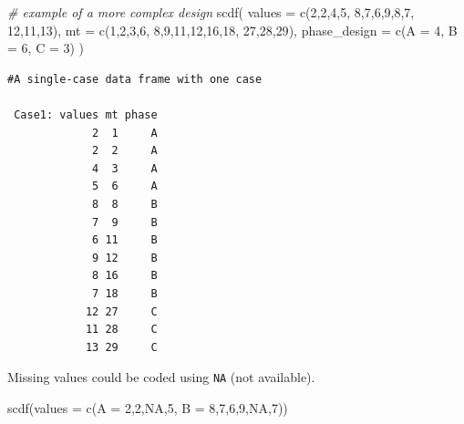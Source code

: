 \documentclass[
]{book}
\newenvironment{Shaded}{\begin{snugshade}}{\end{snugshade}}
\newcommand{\AttributeTok}[1]{\textcolor[rgb]{0.77,0.63,0.00}{#1}}
\newcommand{\CommentTok}[1]{\textcolor[rgb]{0.56,0.35,0.01}{\textit{#1}}}
\newcommand{\ConstantTok}[1]{\textcolor[rgb]{0.00,0.00,0.00}{#1}}
\newcommand{\DecValTok}[1]{\textcolor[rgb]{0.00,0.00,0.81}{#1}}
\newcommand{\FunctionTok}[1]{\textcolor[rgb]{0.00,0.00,0.00}{#1}}
\newcommand{\NormalTok}[1]{#1}
\begin{document}
\begin{Shaded}
\begin{Highlighting}[]
\CommentTok{\# example of a more complex design }
\FunctionTok{scdf}\NormalTok{(}
  \AttributeTok{values =} \FunctionTok{c}\NormalTok{(}\DecValTok{2}\NormalTok{,}\DecValTok{2}\NormalTok{,}\DecValTok{4}\NormalTok{,}\DecValTok{5}\NormalTok{, }\DecValTok{8}\NormalTok{,}\DecValTok{7}\NormalTok{,}\DecValTok{6}\NormalTok{,}\DecValTok{9}\NormalTok{,}\DecValTok{8}\NormalTok{,}\DecValTok{7}\NormalTok{, }\DecValTok{12}\NormalTok{,}\DecValTok{11}\NormalTok{,}\DecValTok{13}\NormalTok{), }
  \AttributeTok{mt =} \FunctionTok{c}\NormalTok{(}\DecValTok{1}\NormalTok{,}\DecValTok{2}\NormalTok{,}\DecValTok{3}\NormalTok{,}\DecValTok{6}\NormalTok{, }\DecValTok{8}\NormalTok{,}\DecValTok{9}\NormalTok{,}\DecValTok{11}\NormalTok{,}\DecValTok{12}\NormalTok{,}\DecValTok{16}\NormalTok{,}\DecValTok{18}\NormalTok{, }\DecValTok{27}\NormalTok{,}\DecValTok{28}\NormalTok{,}\DecValTok{29}\NormalTok{),}
  \AttributeTok{phase\_design =} \FunctionTok{c}\NormalTok{(}\AttributeTok{A =} \DecValTok{4}\NormalTok{, }\AttributeTok{B =} \DecValTok{6}\NormalTok{, }\AttributeTok{C =} \DecValTok{3}\NormalTok{)}
\NormalTok{)}
\end{Highlighting}
\end{Shaded}

\begin{verbatim}
#A single-case data frame with one case

 Case1: values mt phase
             2  1     A
             2  2     A
             4  3     A
             5  6     A
             8  8     B
             7  9     B
             6 11     B
             9 12     B
             8 16     B
             7 18     B
            12 27     C
            11 28     C
            13 29     C
\end{verbatim}

Missing values could be coded using \texttt{NA} (not available).

\begin{Shaded}
\begin{Highlighting}[]
\FunctionTok{scdf}\NormalTok{(}\AttributeTok{values =} \FunctionTok{c}\NormalTok{(}\AttributeTok{A =} \DecValTok{2}\NormalTok{,}\DecValTok{2}\NormalTok{,}\ConstantTok{NA}\NormalTok{,}\DecValTok{5}\NormalTok{, }\AttributeTok{B =} \DecValTok{8}\NormalTok{,}\DecValTok{7}\NormalTok{,}\DecValTok{6}\NormalTok{,}\DecValTok{9}\NormalTok{,}\ConstantTok{NA}\NormalTok{,}\DecValTok{7}\NormalTok{))}
\end{Highlighting}
\end{Shaded}
\end{document}
